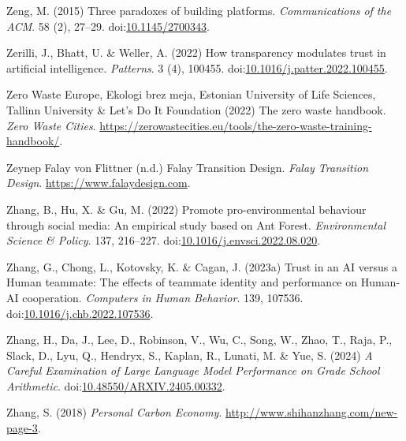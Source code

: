 \documentclass[
  letterpaper,
  DIV=11,
  numbers=noendperiod]{scrartcl}
\newlength{\cslhangindent}
\newenvironment{CSLReferences}[2] %
 {\begin{list}{}{%
  \setlength{\itemindent}{0pt}
  \setlength{\leftmargin}{0pt}
  \setlength{\parsep}{0pt}
  \ifodd #1
   \setlength{\leftmargin}{\cslhangindent}
   \setlength{\itemindent}{-1\cslhangindent}
  \fi
  \setlength{\itemsep}{#2\baselineskip}}}
 {\end{list}}
\begin{document}
\begin{CSLReferences}{0}{1}
Zeng, M. (2015) Three paradoxes of building platforms.
\emph{Communications of the ACM}. 58 (2), 27--29.
doi:\href{https://doi.org/10.1145/2700343}{10.1145/2700343}.

Zerilli, J., Bhatt, U. \& Weller, A. (2022) How transparency modulates
trust in artificial intelligence. \emph{Patterns}. 3 (4), 100455.
doi:\href{https://doi.org/10.1016/j.patter.2022.100455}{10.1016/j.patter.2022.100455}.

Zero Waste Europe, Ekologi brez meja, Estonian University of Life
Sciences, Tallinn University \& Let's Do It Foundation (2022) The zero
waste handbook. \emph{Zero Waste Cities}.
\url{https://zerowastecities.eu/tools/the-zero-waste-training-handbook/}.

Zeynep Falay von Flittner (n.d.) Falay {Transition Design}. \emph{Falay
Transition Design}. \url{https://www.falaydesign.com}.

Zhang, B., Hu, X. \& Gu, M. (2022) Promote pro-environmental behaviour
through social media: {An} empirical study based on {Ant Forest}.
\emph{Environmental Science \& Policy}. 137, 216--227.
doi:\href{https://doi.org/10.1016/j.envsci.2022.08.020}{10.1016/j.envsci.2022.08.020}.

Zhang, G., Chong, L., Kotovsky, K. \& Cagan, J. (2023a) Trust in an {AI}
versus a {Human} teammate: {The} effects of teammate identity and
performance on {Human-AI} cooperation. \emph{Computers in Human
Behavior}. 139, 107536.
doi:\href{https://doi.org/10.1016/j.chb.2022.107536}{10.1016/j.chb.2022.107536}.

Zhang, H., Da, J., Lee, D., Robinson, V., Wu, C., Song, W., Zhao, T.,
Raja, P., Slack, D., Lyu, Q., Hendryx, S., Kaplan, R., Lunati, M. \&
Yue, S. (2024) \emph{A {Careful Examination} of {Large Language Model
Performance} on {Grade School Arithmetic}}.
doi:\href{https://doi.org/10.48550/ARXIV.2405.00332}{10.48550/ARXIV.2405.00332}.

Zhang, S. (2018) \emph{Personal {Carbon Economy}}.
\url{http://www.shihanzhang.com/new-page-3}.


\end{CSLReferences}
\end{document}
